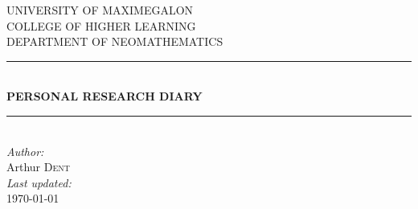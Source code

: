 \newcommand{\HRule}{\rule{\linewidth}{0.5mm}} %

\center %
 

\textsc{\LARGE UNIVERSITY OF MAXIMEGALON}\\[1.5cm] %
\textsc{\Large COLLEGE OF HIGHER LEARNING}\\[0.5cm] %
\textsc{\large DEPARTMENT OF NEOMATHEMATICS}\\[0.5cm] %


\HRule \\[0.8cm]
{ \huge \bfseries PERSONAL RESEARCH DIARY}\\[0.4cm] %
\HRule \\[1.5cm]
 
\Large \emph{Author:}\\
Arthur \textsc{Dent}\\[3cm] %

\Large \emph{Last updated:}\\
{\large \today}\\[2cm] %


